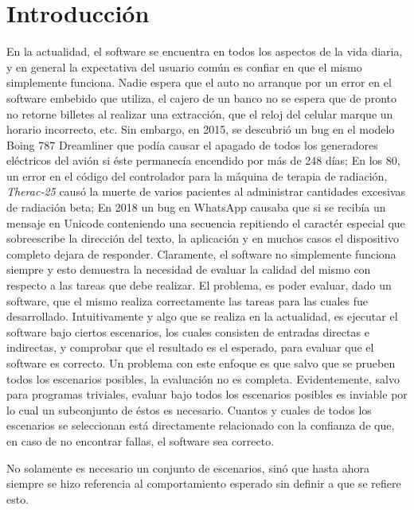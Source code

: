\chapter{Introducci\'on}
\label{cap:introduccion}
En la actualidad, el software se encuentra en todos los aspectos de la vida diaria, y en general la expectativa del usuario com\'un es confiar en que el mismo simplemente funciona. Nadie espera que el auto no arranque por un error en el software embebido que utiliza, el cajero de un banco no se espera que de pronto no retorne billetes al realizar una extracci\'on, que el reloj del celular marque un horario incorrecto, etc. Sin embargo, en 2015, se descubri\'o un bug en el modelo Boing 787 Dreamliner que pod\'ia causar el apagado de todos los generadores el\'ectricos del avi\'on si \'este permanec\'ia encendido por m\'as de 248 d\'ias; En los 80, un error en el c\'odigo del controlador para la m\'aquina de terapia de radiaci\'on, \emph{Therac-25} caus\'o la muerte de varios pacientes al administrar cantidades excesivas de radiaci\'on beta; En 2018 un bug en WhatsApp causaba que si se recib\'ia un mensaje en Unicode conteniendo una secuencia repitiendo el caract\'er especial que sobreescribe la direcci\'on del texto, la aplicaci\'on y en muchos casos el dispositivo completo dejara de responder.
Claramente, el software no simplemente funciona siempre y esto demuestra la necesidad de evaluar la calidad del mismo con respecto a las tareas que debe realizar. El problema, es poder evaluar, dado un software, que el mismo realiza correctamente las tareas para las cuales fue desarrollado. Intuitivamente y algo que se realiza en la actualidad, es ejecutar el software bajo ciertos escenarios, los cuales consisten de entradas directas e indirectas, y comprobar que el resultado es el esperado, para evaluar que el software es correcto. Un problema con este enfoque es que salvo que se prueben todos los escenarios posibles, la evaluaci\'on no es completa. Evidentemente, salvo para programas triviales, evaluar bajo todos los escenarios posibles es inviable por lo cual un subconjunto de \'estos es necesario. Cuantos y cuales de todos los escenarios se seleccionan est\'a directamente relacionado con la confianza de que, en caso de no encontrar fallas, el software sea correcto.

No solamente es necesario un conjunto de escenarios, sin\'o que hasta ahora siempre se hizo referencia al comportamiento esperado sin definir a que se refiere esto.


